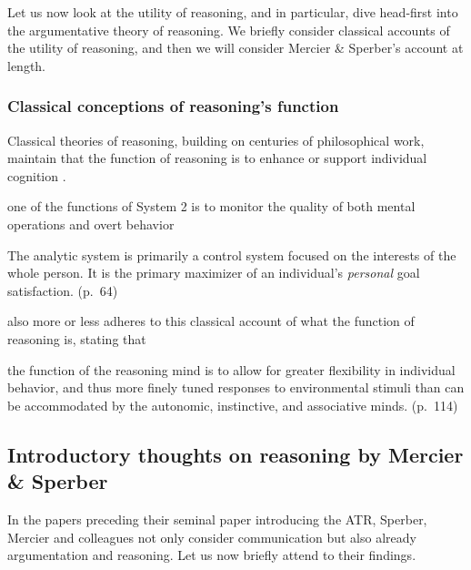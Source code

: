 Let us now look at the utility of reasoning, and in particular, dive head-first into the argumentative theory of reasoning.
We briefly consider classical accounts of the utility of reasoning, and then we will consider Mercier \& Sperber's account at length.

\subsubsection{Classical conceptions of reasoning's function}

Classical theories of reasoning, building on centuries of philosophical work, maintain that the function of reasoning is to enhance or support individual cognition \citep{MS11}.

\begin{quoting}
    one of the functions of System 2 is to monitor the quality of both mental operations and overt behavior
    \hfill \citep[p.~699]{Kahneman03}
\end{quoting}

\begin{quoting}
    The analytic system is primarily a control system focused on the interests of the whole person. It is the primary maximizer of an individual's \emph{personal} goal satisfaction.
    (p.~64)
\end{quoting}

\citet{Goel22} also more or less adheres to this classical account of what the function of reasoning is, stating that
\begin{quoting}
    the function of the reasoning mind is to allow for greater flexibility in individual behavior, and thus more finely tuned responses to environmental stimuli than can be accommodated by the autonomic, instinctive, and associative minds.
    \hfill (p.~114)
\end{quoting}

\subsection{Introductory thoughts on reasoning by Mercier \& Sperber}


In the papers preceding their \citeyear{MS11} seminal paper introducing the ATR, Sperber, Mercier and colleagues not only consider communication but also already argumentation and reasoning. Let us now briefly attend to their findings.

